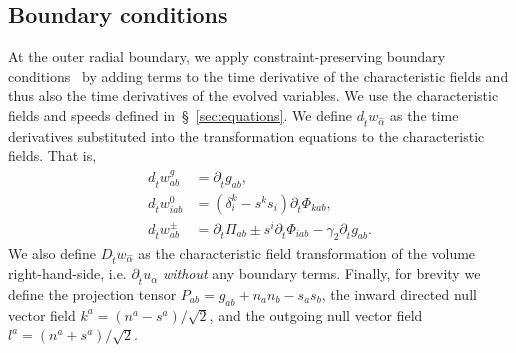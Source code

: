 \begin{bibunit}[unsrtnat]
\subsection{Boundary conditions\label{sec:boundary conditions}}

At the outer radial boundary, we apply constraint-preserving boundary
conditions~\cite{Lindblom:2005qh, Rinne:2007ui} by adding terms to the time
derivative of the characteristic fields and thus also the time derivatives of
the evolved variables. We use the characteristic fields and speeds defined
in~\S~\ref{sec:equations}. We define $d_{\hat{t}} w_{\hat{\alpha}}$ as the time
derivatives substituted into the transformation equations to the characteristic
fields. That is,
\begin{align}
  \label{eq:fosh gh dtw g}
  d_{\hat{t}}w^{g}_{ab} &= \partial_{\hat{t}} g_{ab}, \\
  \label{eq:fosh gh dtw 0}
  d_{\hat{t}} w^{0}_{iab} &= (\delta^k_i-s^k s_i)\partial_{\hat{t}} \Phi_{kab},
  \\
  \label{eq:fosh gh dtw pm}
  d_{\hat{t}} w^{\pm}_{ab} &= \partial_{\hat{t}} \Pi_{ab}\pm
                             s^i\partial_{\hat{t}} \Phi_{iab}
                             -\gamma_2\partial_{\hat{t}} g_{ab}.
\end{align}
We also define $D_{\hat{t}} w_{\hat{\alpha}}$ as the characteristic field
transformation of the volume right-hand-side, i.e. $\partial_{\hat{t}} u_\alpha$
\textit{without} any boundary terms. Finally, for brevity we define the
projection tensor $P_{ab}=g_{ab}+n_a n_b-s_as_b$, the inward directed null
vector field $k^a=(n^a-s^a)/\sqrt{2}$, and the outgoing null vector field
$l^a=(n^a+s^a)/\sqrt{2}$.


\end{bibunit}

